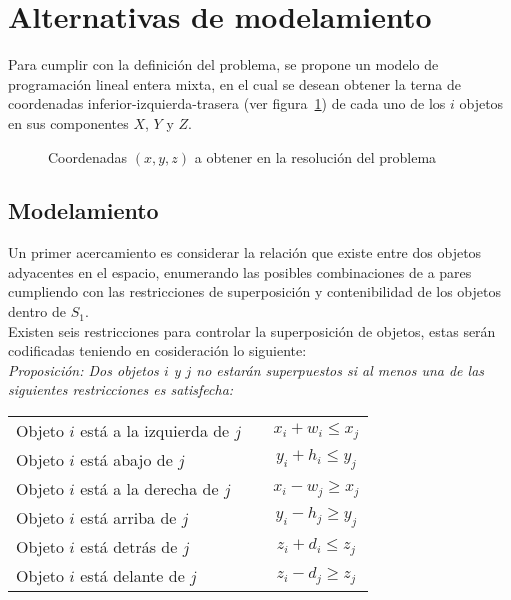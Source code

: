 \section{Alternativas de modelamiento\label{sec:alternativas_modelamiento}}

Para cumplir con la definición del problema, se propone un modelo de
programación lineal entera mixta, en el cual se desean obtener la terna de
coordenadas inferior-izquierda-trasera (ver figura~\ref{fig:fig_2_1})
de cada uno de los $i$ objetos en sus componentes $X$, $Y$ y $Z$. \\

\begin{figure}[!htb]
 \centering{}
 \caption{Coordenadas $(x,y,z)$ a obtener en la resolución del problema}
 \label{fig:fig_2_1}
\end{figure}

\subsection{Modelamiento}

Un primer acercamiento es considerar la relación que existe entre dos
objetos adyacentes en el espacio, enumerando las posibles combinaciones
de a pares cumpliendo con las restricciones de superposición y contenibilidad
de los objetos dentro de $S_1$. \\

Existen seis restricciones para controlar la superposición de objetos,
estas serán co\-dificadas teniendo en cosideración lo siguiente: \\

\textit{Proposición: Dos objetos $i$ y $j$ no estarán superpuestos si
al menos una de las siguientes restricciones es satisfecha:}
\begin{center}
\begin{tabular}{l p{1cm} c}
Objeto $i$ está a la izquierda de $j$ & & $x_i + w_i \le x_j$ \\
Objeto $i$ está abajo de $j$          & & $y_i + h_i \le y_j$ \\
Objeto $i$ está a la derecha de $j$   & & $x_i - w_j \ge x_j$ \\
Objeto $i$ está arriba de $j$         & & $y_i - h_j \ge y_j$ \\
Objeto $i$ está detrás de $j$         & & $z_i + d_i \le z_j$ \\
Objeto $i$ está delante de $j$        & & $z_i - d_j \ge z_j$ \\
\end{tabular}
\end{center}

